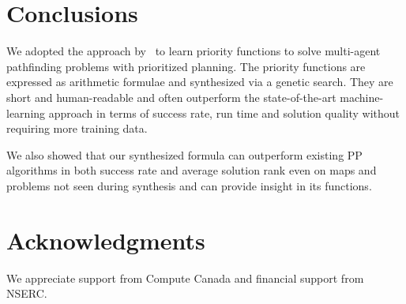 \documentclass[letterpaper]{article}
\begin{document}
\section{Conclusions}
\label{sec:conclusions}

We adopted the approach by~\citet{bulitko2022portability} to learn priority functions to solve multi-agent pathfinding problems with prioritized planning. The priority functions are expressed as arithmetic formulae and synthesized via a genetic search. They are short and human-readable and often outperform the state-of-the-art machine-learning approach in terms of success rate, run time and solution quality without requiring more training data.

We also showed that our synthesized formula can outperform existing PP algorithms in both success rate and average solution rank even on maps and problems not seen during synthesis and can provide insight in its functions.

\section*{Acknowledgments}

We appreciate support from Compute Canada and financial support from NSERC.
\end{document}
